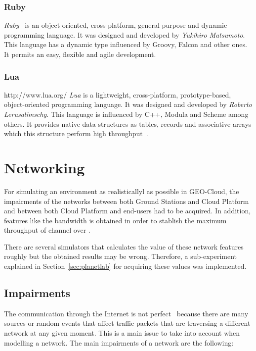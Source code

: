 \subsubsection{Ruby}
\emph{Ruby}~\cite{Community} is an object-oriented, cross-platform, general-purpose and dynamic
programming language. It was designed and developed by \emph{Yukihiro
  Matsumoto}. This language has a dynamic type influenced by Groovy, Falcon and
other ones. It permits an easy, flexible and agile development.


\subsubsection{Lua}
http://www.lua.org/
\emph{Lua} is a lightweight, cross-platform, prototype-based, object-oriented programming
language. It was designed and developed by \emph{Roberto Lerusalimschy}. This
language is influenced by C++, Modula and Scheme among others. It provides
native data structures as tables, records and associative arrays which this
structure perform high throughput~\cite{Organization2014}.


\section{Networking}

For simulating an environment as realisticallyl as possible in GEO-Cloud, the impairments  of the networks between both Ground Stations and Cloud Platform
and between both Cloud Platform and end-users had to be acquired. In addition, features
like the bandwidth is obtained in order to stablish the maximum throughput of
channel over \vw.

There are several simulators that
calculates the value of these network features roughly but the obtained results
may be wrong. Therefore, a sub-experiment explained in
Section~\ref{sec:planetlab} for acquiring these values was implemented.

\subsection{Impairments}

The communication through the Internet is not perfect~\cite{Tanenbaum2003} because there are many
sources or random events that affect traffic packets that are traversing a
different network  at any given moment. This is a main issue to take into
account when modelling a network. The main
impairments of a network are the following:

